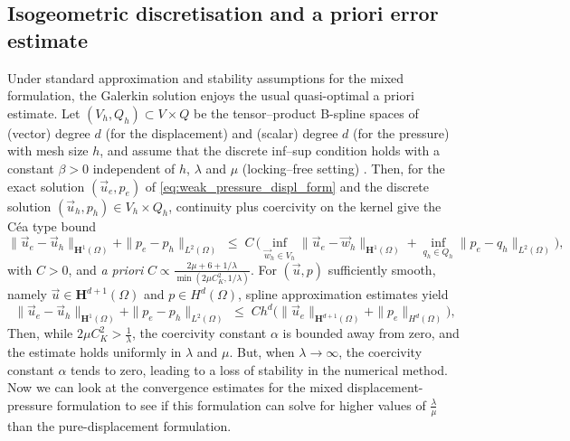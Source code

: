 \documentclass[a4paper,12pt,twoside]{report}
\begin{document}
\subsection{Isogeometric discretisation and a priori error estimate}
Under standard approximation and stability assumptions for the mixed formulation, the Galerkin solution enjoys the usual quasi-optimal a priori estimate. Let $(V_h,Q_h)\subset V\times Q$ be the tensor–product B-spline spaces of (vector) degree $d$ (for the displacement) and (scalar) degree $d$ (for the pressure) with mesh size $h$, and assume that the discrete inf–sup condition holds with a constant $\beta>0$ independent of $h$, $\lambda$ and $\mu$ (locking–free setting) \cite{boffi_mixed_2008}. Then, for the exact solution $(\vec u_e,p_e)$ of \eqref{eq:weak_pressure_displ_form} and the discrete solution $(\vec u_h,p_h)\in V_h\times Q_h$, continuity plus coercivity on the kernel give the Céa type bound
\[
\|\vec u_e-\vec u_h\|_{\boldsymbol H^1(\Omega)}+\|p_e-p_h\|_{L^2(\Omega)}
\;\le\; C\,\Big( \inf_{\vec w_h\in V_h}\|\vec u_e-\vec w_h\|_{\boldsymbol H^1(\Omega)} + \inf_{q_h\in Q_h}\|p_e-q_h\|_{L^2(\Omega)}\Big),
\]
with $C > 0$, and \textit{a priori} $C \propto \frac{2\mu + 6 + 1/\lambda}{\min(2\mu C_K^2,1 / \lambda)}$. For $(\vec u,p)$ sufficiently smooth, namely $\vec u\in \boldsymbol H^{d+1}(\Omega)$ and $p\in H^{d}(\Omega)$, spline approximation estimates yield
\[
\|\vec u_e-\vec u_h\|_{\boldsymbol H^1(\Omega)}+\|p_e-p_h\|_{L^2(\Omega)} \;\le\; C h^{d}\Big(\|\vec u_e\|_{\boldsymbol H^{d+1}(\Omega)}+\|p_e\|_{H^{d}(\Omega)}\Big),
\]
Then, while $2 \mu C_K^2 > \frac{1}{\lambda}$, the coercivity constant $\alpha$ is bounded away from zero, and the estimate holds uniformly in $\lambda$ and $\mu$. But, when $\lambda \rightarrow \infty$, the coercivity constant $\alpha$ tends to zero, leading to a loss of stability in the numerical method. Now we can look at the convergence estimates for the mixed displacement-pressure formulation to see if this formulation can solve for higher values of $\frac{\lambda}{\mu}$ than the pure-displacement formulation.


\end{document}
